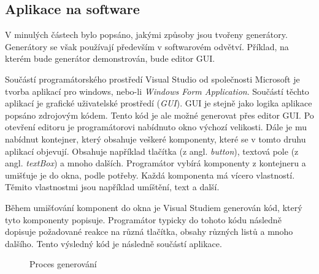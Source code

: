 \subsection{Aplikace na software}
V minulých částech bylo popsáno, jakými způsoby jsou tvořeny generátory. Generátory se však používají především v softwarovém odvětví. Příklad, na kterém bude generátor demonstrován, bude editor GUI.

Součástí programátorského prostředí Visual Studio od společnosti Microsoft je tvorba aplikací pro windows, nebo-li \textit{Windows Form Application}. Součástí těchto aplikací je grafické uživatelské prostředí (\textit{GUI}). GUI je stejně jako logika aplikace popsáno zdrojovým kódem. Tento kód je ale možné generovat přes editor GUI. Po otevření editoru je programátorovi nabídnuto okno výchozí velikosti. Dále je mu nabídnut kontejner, který obsahuje veškeré komponenty, které se v tomto druhu aplikací objevují. Obsahuje například tlačítka (z angl. \textit{button}), textová pole (z angl. \textit{textBox}) a mnoho dalších. Programátor vybírá komponenty z kontejneru a umišťuje je do okna, podle potřeby. Každá komponenta má vícero vlastností. Těmito vlastnostmi jsou například umíštění, text a další.

Během umišťování komponent do okna je Visual Studiem generován kód, který tyto komponenty popisuje. Programátor typicky do tohoto kódu následně dopisuje požadované reakce na různá tlačítka, obsahy různých listů a mnoho dalšího. Tento výsledný kód je následně součástí aplikace. 


\begin{figure}[H]
	\centering
	\caption{Proces generování}
\end{figure}

